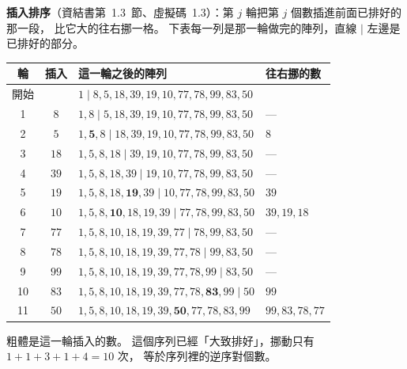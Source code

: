 \begin{pastsoln}
\textbf{插入排序}（資結書第~1.3~節、虛擬碼~1.3）：第 $j$ 輪把第 $j$ 個數插進前面已排好的那一段，
比它大的往右挪一格。 下表每一列是那一輪做完的陣列，直線 $\mid$ 左邊是已排好的部分。
\begin{center}
\small
\begin{tabular}{ccll}
\toprule
輪 & 插入 & 這一輪之後的陣列 & 往右挪的數 \\
\midrule
開始 & & $1 \mid 8, 5, 18, 39, 19, 10, 77, 78, 99, 83, 50$ &  \\
1 & $8$ & $1, 8 \mid 5, 18, 39, 19, 10, 77, 78, 99, 83, 50$ & — \\
2 & $5$ & $1, \mathbf{5}, 8 \mid 18, 39, 19, 10, 77, 78, 99, 83, 50$ & $8$ \\
3 & $18$ & $1, 5, 8, 18 \mid 39, 19, 10, 77, 78, 99, 83, 50$ & — \\
4 & $39$ & $1, 5, 8, 18, 39 \mid 19, 10, 77, 78, 99, 83, 50$ & — \\
5 & $19$ & $1, 5, 8, 18, \mathbf{19}, 39 \mid 10, 77, 78, 99, 83, 50$ & $39$ \\
6 & $10$ & $1, 5, 8, \mathbf{10}, 18, 19, 39 \mid 77, 78, 99, 83, 50$ & $39, 19, 18$ \\
7 & $77$ & $1, 5, 8, 10, 18, 19, 39, 77 \mid 78, 99, 83, 50$ & — \\
8 & $78$ & $1, 5, 8, 10, 18, 19, 39, 77, 78 \mid 99, 83, 50$ & — \\
9 & $99$ & $1, 5, 8, 10, 18, 19, 39, 77, 78, 99 \mid 83, 50$ & — \\
10 & $83$ & $1, 5, 8, 10, 18, 19, 39, 77, 78, \mathbf{83}, 99 \mid 50$ & $99$ \\
11 & $50$ & $1, 5, 8, 10, 18, 19, 39, \mathbf{50}, 77, 78, 83, 99$ & $99, 83, 78, 77$ \\
\bottomrule
\end{tabular}
\end{center}
粗體是這一輪插入的數。 這個序列已經「大致排好」，挪動只有 $1 + 1 + 3 + 1 + 4 = 10$ 次，
等於序列裡的逆序對個數。


\end{pastsoln}
